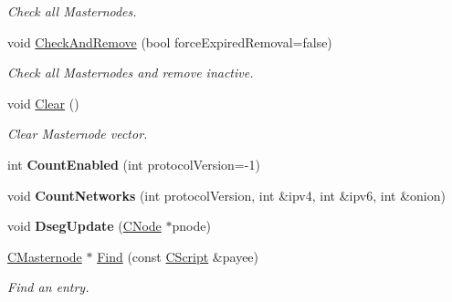 \begin{DoxyCompactItemize}
\begin{DoxyCompactList}\small\item\em Check all Masternodes. \end{DoxyCompactList}\item 
\mbox{\label{class_c_masternode_man_afe98a39ce1377f9e58ea410842187b0d}} 
void \mbox{\hyperlink{class_c_masternode_man_afe98a39ce1377f9e58ea410842187b0d}{Check\+And\+Remove}} (bool force\+Expired\+Removal=false)
\begin{DoxyCompactList}\small\item\em Check all Masternodes and remove inactive. \end{DoxyCompactList}\item 
\mbox{\label{class_c_masternode_man_ab18e991ea61209e6282aee80121724dd}} 
void \mbox{\hyperlink{class_c_masternode_man_ab18e991ea61209e6282aee80121724dd}{Clear}} ()
\begin{DoxyCompactList}\small\item\em Clear Masternode vector. \end{DoxyCompactList}\item 
\mbox{\label{class_c_masternode_man_ae495279a035d7d259375ae95cbde28f4}} 
int {\bfseries Count\+Enabled} (int protocol\+Version=-\/1)
\item 
\mbox{\label{class_c_masternode_man_ad9c856855690a334742d7044c7166a2a}} 
void {\bfseries Count\+Networks} (int protocol\+Version, int \&ipv4, int \&ipv6, int \&onion)
\item 
\mbox{\label{class_c_masternode_man_a5aa389cb63e70edf9fd9e2eb7fe90750}} 
void {\bfseries Dseg\+Update} (\mbox{\hyperlink{class_c_node}{C\+Node}} $\ast$pnode)
\item 
\mbox{\label{class_c_masternode_man_a3d34836c6992d29c485ba94a0c1e0ae6}} 
\mbox{\hyperlink{class_c_masternode}{C\+Masternode}} $\ast$ \mbox{\hyperlink{class_c_masternode_man_a3d34836c6992d29c485ba94a0c1e0ae6}{Find}} (const \mbox{\hyperlink{class_c_script}{C\+Script}} \&payee)
\begin{DoxyCompactList}\small\item\em Find an entry. \end{DoxyCompactList}\item 

\end{DoxyCompactItemize}
